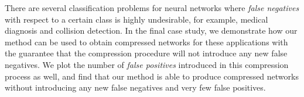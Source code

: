 There are several classification problems for neural networks where
\textit{false negatives} with respect to a certain class is highly undesirable,
for example,
medical diagnosis and collision detection. In the final case study, we
demonstrate how our method can be used to obtain compressed networks for these
applications with the guarantee that the compression procedure will not
introduce any new false negatives. We plot the number of \textit{false
positives} introduced in this compression process as well, and find that our
method is able to produce compressed networks without introducing any new false
negatives and very few false positives. 

